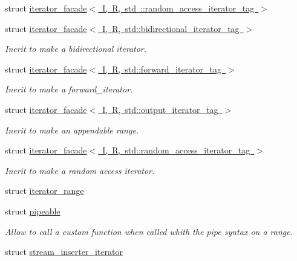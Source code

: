 \begin{DoxyCompactItemize}
struct \mbox{\hyperlink{structrah_1_1iterator__facade_3_01_i_00_01_r_00_01std_01_1_1random__access__iterator__tag_01_4}{iterator\+\_\+facade$<$ I, R, std \+::random\+\_\+access\+\_\+iterator\+\_\+tag $>$}}
\item 
struct \mbox{\hyperlink{structrah_1_1iterator__facade_3_01_i_00_01_r_00_01std_1_1bidirectional__iterator__tag_01_4}{iterator\+\_\+facade$<$ I, R, std\+::bidirectional\+\_\+iterator\+\_\+tag $>$}}
\begin{DoxyCompactList}\small\item\em Inerit to make a bidirectional iterator. \end{DoxyCompactList}\item 
struct \mbox{\hyperlink{structrah_1_1iterator__facade_3_01_i_00_01_r_00_01std_1_1forward__iterator__tag_01_4}{iterator\+\_\+facade$<$ I, R, std\+::forward\+\_\+iterator\+\_\+tag $>$}}
\begin{DoxyCompactList}\small\item\em Inerit to make a forward\+\_\+iterator. \end{DoxyCompactList}\item 
struct \mbox{\hyperlink{structrah_1_1iterator__facade_3_01_i_00_01_r_00_01std_1_1output__iterator__tag_01_4}{iterator\+\_\+facade$<$ I, R, std\+::output\+\_\+iterator\+\_\+tag $>$}}
\begin{DoxyCompactList}\small\item\em Inerit to make an appendable range. \end{DoxyCompactList}\item 
struct \mbox{\hyperlink{structrah_1_1iterator__facade_3_01_i_00_01_r_00_01std_1_1random__access__iterator__tag_01_4}{iterator\+\_\+facade$<$ I, R, std\+::random\+\_\+access\+\_\+iterator\+\_\+tag $>$}}
\begin{DoxyCompactList}\small\item\em Inerit to make a random access iterator. \end{DoxyCompactList}\item 
struct \mbox{\hyperlink{structrah_1_1iterator__range}{iterator\+\_\+range}}
\item 
struct \mbox{\hyperlink{structrah_1_1pipeable}{pipeable}}
\begin{DoxyCompactList}\small\item\em Allow to call a custom function when called whith the \textquotesingle{}pipe\textquotesingle{} syntax on a range. \end{DoxyCompactList}\item 
struct \mbox{\hyperlink{structrah_1_1stream__inserter__iterator}{stream\+\_\+inserter\+\_\+iterator}}
\end{DoxyCompactItemize}
